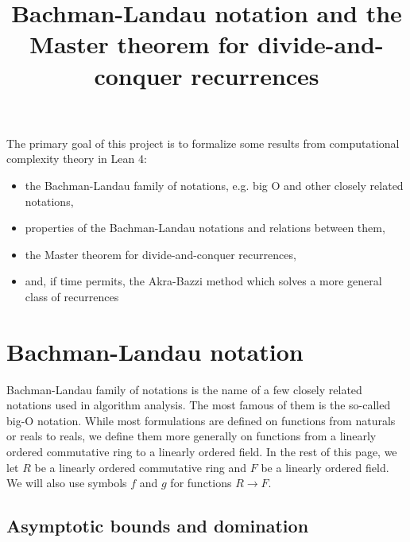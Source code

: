 %

\title{Bachman-Landau notation and the Master theorem for divide-and-conquer recurrences}

The primary goal of this project is to formalize some results from computational 
complexity theory in Lean 4:
\begin{itemize}
\item the Bachman-Landau family of notations, e.g. big O and other closely related notations,
\item properties of the Bachman-Landau notations and relations between them,
\item the Master theorem for divide-and-conquer recurrences,
\item and, if time permits, the Akra-Bazzi method which solves a more general class of recurrences
\end{itemize}

\section{Bachman-Landau notation}

Bachman-Landau family of notations is the name of a few closely related notations used in 
algorithm analysis. The most famous of them is the so-called big-O notation. While
most formulations are defined on functions from naturals or reals to reals, we define 
them more generally on functions from a linearly ordered commutative ring to a
linearly ordered field. In the rest of this page, we let $R$ be a linearly ordered 
commutative ring and $F$ be a linearly ordered field. We will also use symbols $f$ and 
$g$ for functions $R \to F$.

\subsection{Asymptotic bounds and domination}

